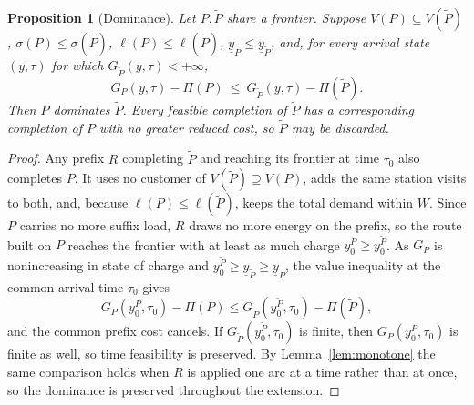 \documentclass[review,3p,authoryear]{elsarticle}
\theoremstyle{plain}
\newtheorem{proposition}{Proposition}
\theoremstyle{definition}
\theoremstyle{remark}
\begin{document}
\begin{proposition}[Dominance]
\label{prop:dominance}
Let $P,\tilde P$ share a frontier. Suppose $V(P)\subseteq V(\tilde P)$,
$\sigma(P)\le\sigma(\tilde P)$, $\ell(P)\le\ell(\tilde P)$,
$\underline{y}_P\le\underline{y}_{\tilde P}$, and, for every arrival state
$(y,\tau)$ for which $G_{\tilde P}(y,\tau)<+\infty$,
\[
G_P(y,\tau)-\Pi(P)\ \le\ G_{\tilde P}(y,\tau)-\Pi(\tilde P).
\]
Then $P$ dominates $\tilde P$. Every feasible completion of $\tilde P$ has a
corresponding completion of $P$ with no greater reduced cost, so $\tilde P$ may be
discarded.
\end{proposition}

\begin{proof}
Any prefix $R$ completing $\tilde P$ and reaching its frontier at time $\tau_0$
also completes $P$. It uses no customer of
$V(\tilde P)\supseteq V(P)$, adds the same station visits to both, and, because
$\ell(P)\le\ell(\tilde P)$, keeps the total demand within $W$. Since $P$ carries no
more suffix load, $R$ draws no more energy on the prefix, so the route built on $P$
reaches the frontier with at least as much charge \(y_0^P\ge y_0^{\tilde P}\). As
$G_P$ is nonincreasing in state of charge and
\(y_0^{\tilde P}\ge\underline{y}_{\tilde P}\ge\underline{y}_P\), the value inequality
at the common arrival time $\tau_0$ gives
\[
G_P(y_0^P,\tau_0)-\Pi(P)
\le
G_{\tilde P}(y_0^{\tilde P},\tau_0)-\Pi(\tilde P),
\]
and the common prefix cost cancels. If \(G_{\tilde P}(y_0^{\tilde P},\tau_0)\) is
finite, then \(G_P(y_0^P,\tau_0)\) is finite as well, so time feasibility is preserved.
By Lemma~\ref{lem:monotone} the same comparison holds when $R$ is applied one arc at a
time rather than at once, so the dominance is preserved throughout the extension.
\end{proof}
\end{document}
